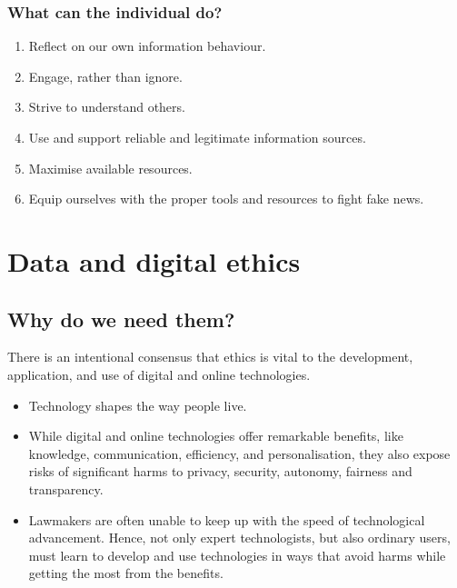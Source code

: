 \documentclass[11pt]{article}
\begin{document}
\subsubsection{What can the individual do?}
\label{sec:org1a3ace1}
\begin{enumerate}
\item Reflect on our own information behaviour.
\item Engage, rather than ignore.
\item Strive to understand others.
\item Use and support reliable and legitimate information sources.
\item Maximise available resources.
\item Equip ourselves with the proper tools and resources to fight fake news.
\end{enumerate}


\section{Data and digital ethics}
\label{sec:org80a3e06}

\subsection{Why do we need them?}
\label{sec:org8763022}
There is an intentional consensus that ethics is vital to the development, application, and use of digital and online technologies.
\begin{itemize}
\item Technology shapes the way people live.
\item While digital and online technologies offer remarkable benefits, like knowledge, communication, efficiency, and personalisation, they also expose risks of significant harms to privacy, security, autonomy, fairness and transparency.
\item Lawmakers are often unable to keep up with the speed of technological advancement. Hence, not only expert technologists, but also ordinary users, must learn to develop and use technologies in ways that avoid harms while getting the most from the benefits.
\end{itemize}

 \newpage
\end{document}
